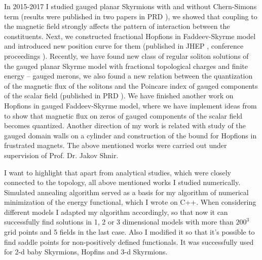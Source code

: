 \documentclass[paper=a4,fontsize=11pt]{scrartcl} %
\begin{document}
In 2015-2017 I studied gauged planar Skyrmions with and without Chern-Simons term (results were published in two papers in PRD \cite{GaugedBaby,GaugedBabyCS}), we showed that coupling to the magnetic field strongly affects the pattern of interaction between the constituents. Next, we constructed fractional Hopfions in Faddeev-Skyrme model and introduced new position curve for them (published in JHEP \cite{FractionalHopf}, conference proceedings \cite{SkyrmeFamily}). Recently, we have found new class of regular soliton solutions of the gauged planar Skyrme model with fractional topological charges and finite energy -- gauged merons, we also found a new relation between the quantization of the magnetic flux of the solitons and the Poincare index of gauged components of the scalar field (published in PRD \cite{GaugedMerons}). We have finished another work on Hopfions \cite{MagneticHopfions} in gauged Faddeev-Skyrme model, where we have implement ideas from \cite{GaugedMerons} to show that magnetic flux on zeros of gauged components of the scalar field becomes quantized. Another direction of my work is related with study of the gauged domain walls on a cylinder and construction of the bound for Hopfions in frustrated magnets. The above mentioned works were carried out under supervision of Prof. Dr. Jakov Shnir.

I want to highlight that apart from analytical studies, which were closely connected to the topology, all above mentioned works I studied numerically. Simulated annealing algorithm served as a basis for my algorithm of numerical minimization of the energy functional, which I wrote on C++. When considering different models I adapted my algorithm accordingly, so that now it can successfully find solutions in 1, 2 or 3 dimensional models with more than $200^3$ grid points and 5 fields in the last case. Also I modified it so that it's possible to find saddle points for non-positively defined functionals. It was successfully used for 2-d baby Skyrmions, Hopfins and 3-d Skyrmions.
\end{document}
